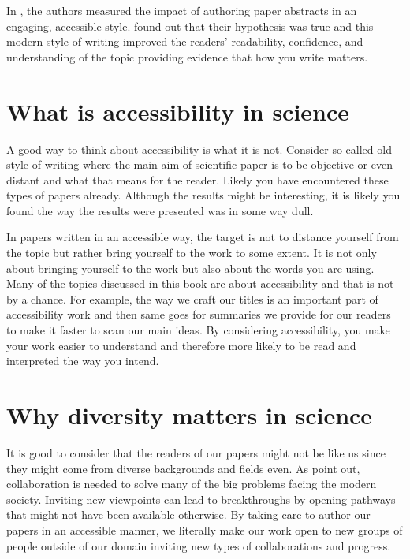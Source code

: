 In \citet{ryba2021better}, the authors measured the impact of authoring paper abstracts in an engaging, accessible style. \citet{ryba2021better} found out that their hypothesis was true and this modern style of writing improved the readers' readability, confidence, and understanding of the topic providing evidence that how you write matters.

\section{What is accessibility in science}

A good way to think about accessibility is what it is not.
Consider so-called old style of writing where the main aim of scientific paper is to be objective or even distant \citep{ryba2021better} and what that means for the reader.
Likely you have encountered these types of papers already.
Although the results might be interesting, it is likely you found the way the results were presented was in some way dull.

In papers written in an accessible way, the target is not to distance yourself from the topic but rather bring yourself to the work to some extent.
It is not only about bringing yourself to the work but also about the words you are using.
Many of the topics discussed in this book are about accessibility and that is not by a chance.
For example, the way we craft our titles is an important part of accessibility work and then same goes for summaries we provide for our readers to make it faster to scan our main ideas.
By considering accessibility, you make your work easier to understand and therefore more likely to be read and interpreted the way you intend.

\section{Why diversity matters in science}

It is good to consider that the readers of our papers might not be like us since they might come from diverse backgrounds and fields even.
As \citet{ryba2021better} point out, collaboration is needed to solve many of the big problems facing the modern society.
Inviting new viewpoints can lead to breakthroughs by opening pathways that might not have been available otherwise.
By taking care to author our papers in an accessible manner, we literally make our work open to new groups of people outside of our domain inviting new types of collaborations and progress.

